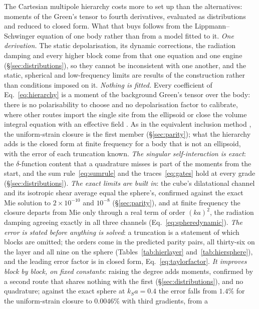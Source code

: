 \documentclass[11pt,a4paper]{article}
\begin{document}
The Cartesian multipole hierarchy costs more to set up than the alternatives: moments of the Green's
tensor to fourth derivatives, evaluated as distributions and reduced to closed form. What that buys
follows from the Lippmann--Schwinger equation of one body rather than from a model fitted to it.
\emph{One derivation.} The static depolarisation, its dynamic corrections, the radiation damping and
every higher block come from that one equation and one engine (\S\ref{sec:distributions}), so they
cannot be inconsistent with one another, and the static, spherical and low-frequency limits are results
of the construction rather than conditions imposed on it. \emph{Nothing is fitted.} Every coefficient of
Eq.~\eqref{eq:hierarchy} is a moment of the background Green's tensor over the body: there is no
polarisability to choose and no depolarisation factor to calibrate, where other routes import the single
site from the ellipsoid \citep{Eshelby1957,Mura1987} or close the volume integral equation with an
effective field \citep{MalKnopoff1967,Kanaun2008}. As in the equivalent inclusion method
\citep{Moschovidis1975,FuMura1983}, the uniform-strain closure is the first member (\S\ref{sec:parity});
what the hierarchy adds is the closed form at finite frequency for a body that is not an ellipsoid, with
the error of each truncation known. \emph{The singular self-interaction is exact}: the $\delta$-function
content that a quadrature misses is part of the moments from the start, and the sum
rule~\eqref{eq:sumrule} and the traces~\eqref{eq:gates} hold at every grade (\S\ref{sec:distributions}).
\emph{The exact limits are built in}: the cube's dilatational channel and its isotropic shear average
equal the sphere's, confirmed against the exact Mie solution to $2\times10^{-10}$ and $10^{-8}$
(\S\ref{sec:parity}), and at finite frequency the closure departs from Mie only through a real term of
order $(ka)^2$, the radiation damping agreeing exactly in all three channels
(Eq.~\eqref{eq:spheredynamic}). \emph{The error is stated before anything is solved}: a truncation is a
statement of which blocks are omitted; the orders come in the predicted parity pairs, all thirty-six on
the layer and all nine on the sphere (Tables~\ref{tab:hierlayer} and~\ref{tab:hiersphere}), and the
leading error factor is in closed form, Eq.~\eqref{eq:taylorfactor}. \emph{It improves block by block,
on fixed constants}: raising the degree adds moments, confirmed by a second route that shares nothing
with the first (\S\ref{sec:distributions}), and no quadrature; against the exact sphere at $k_Sa=0.4$
the error falls from $1.4\%$ for the uniform-strain closure to $0.0046\%$ with third gradients, from a
\end{document}
